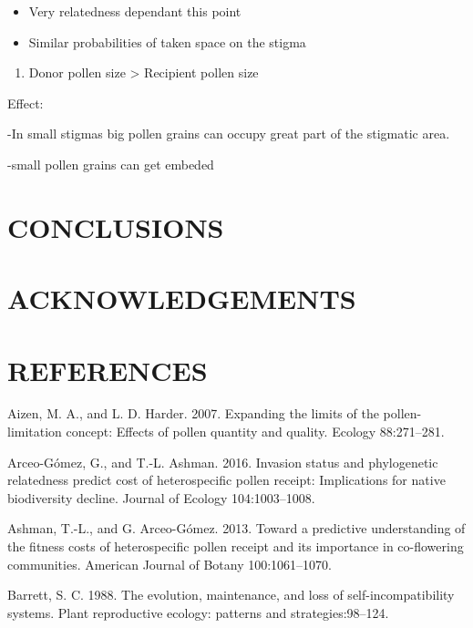 \documentclass[11pt,a4paper]{article}
\providecommand{\tightlist}{%
  \setlength{\itemsep}{0pt}\setlength{\parskip}{0pt}}
\begin{document}
\begin{itemize}
\item
  Very relatedness dependant this point
\item
  Similar probabilities of taken space on the stigma
\end{itemize}

\begin{enumerate}
\def\labelenumi{\arabic{enumi})}
\setcounter{enumi}{2}
\tightlist
\item
  Donor pollen size \textgreater{} Recipient pollen size
\end{enumerate}

Effect:

-In small stigmas big pollen grains can occupy great part of the
stigmatic area.

-small pollen grains can get embeded

\section{CONCLUSIONS}\label{conclusions}

\section{ACKNOWLEDGEMENTS}\label{acknowledgements}

\section{REFERENCES}\label{references}

\hypertarget{refs}{}
\hypertarget{ref-aizen2007}{}
Aizen, M. A., and L. D. Harder. 2007. Expanding the limits of the
pollen-limitation concept: Effects of pollen quantity and quality.
Ecology 88:271--281.

\hypertarget{ref-arceo2016}{}
Arceo-Gómez, G., and T.-L. Ashman. 2016. Invasion status and
phylogenetic relatedness predict cost of heterospecific pollen receipt:
Implications for native biodiversity decline. Journal of Ecology
104:1003--1008.

\hypertarget{ref-ashman2013}{}
Ashman, T.-L., and G. Arceo-Gómez. 2013. Toward a predictive
understanding of the fitness costs of heterospecific pollen receipt and
its importance in co-flowering communities. American Journal of Botany
100:1061--1070.

\hypertarget{ref-barrett1988}{}
Barrett, S. C. 1988. The evolution, maintenance, and loss of
self-incompatibility systems. Plant reproductive ecology: patterns and
strategies:98--124.
\end{document}
